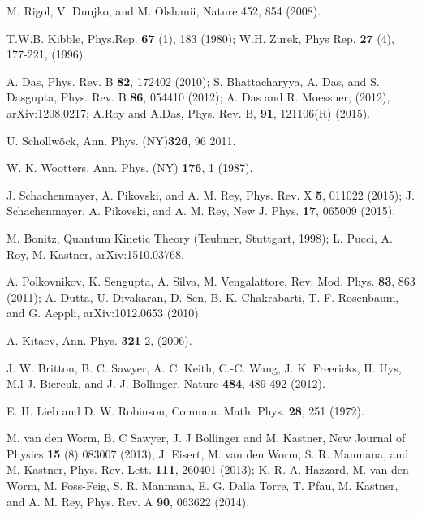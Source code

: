 \documentclass[a4paper,11pt,color]{article}
\renewenvironment{thebibliography}[1]{%
    \begin{oldthebibliography}{#1}%
      \setlength{\parskip}{0ex}%
      \setlength{\itemsep}{0ex}%
  }%
  {%
    \end{oldthebibliography}%
  }
\begin{document}
\pagebreak
\begin{thebibliography}{}
  
M. Rigol, V. Dunjko, and M. Olshanii, Nature 452, 854 (2008).

T.W.B. Kibble, Phys.Rep. {\bf 67} (1), 183 (1980); W.H. Zurek, Phys Rep. {\bf 27} (4), 177-221, (1996).

A. Das, Phys. Rev. B {\bf 82}, 172402 (2010); S. Bhattacharyya, A. Das, and S. Dasgupta, Phys. Rev.
B {\bf 86}, 054410 (2012); A. Das and R. Moessner, (2012), arXiv:1208.0217; A.Roy and A.Das, Phys. Rev. B, {\bf 91}, 121106(R) (2015).

%
 {U.} {Schollw{\"o}ck},  {Ann. Phys. (NY)}\textbf {{326}}, {96}  {2011}.
 
W. K. Wootters, Ann. Phys. (NY) {\bf 176}, 1 (1987).

J. Schachenmayer, A. Pikovski, and A. M. Rey, Phys. Rev. X {\bf 5}, 011022 (2015); J. Schachenmayer, A. Pikovski, and A. M. Rey, New J. Phys.
{\bf 17}, 065009 (2015).

M. Bonitz, Quantum Kinetic Theory (Teubner, Stuttgart, 1998); L. Pucci, A. Roy, M. Kastner, arXiv:1510.03768.


A. Polkovnikov, K. Sengupta, A. Silva, M. Vengalattore, Rev. Mod. Phys. \textbf{83}, 863 (2011); A. Dutta, U. Divakaran, D. Sen, B. K. Chakrabarti, T. F. Rosenbaum, and G. Aeppli, arXiv:1012.0653 (2010).


A. Kitaev, Ann. Phys. {\bf 321} 2, (2006).


J. W. Britton,	B. C. Sawyer,	A. C. Keith,	C.-C. Wang,	J. K. Freericks, H. Uys,	M.l J. Biercuk, and J. J. Bollinger, Nature {\bf 484}, 489-492 (2012).



E. H. Lieb and D. W. Robinson, Commun. Math. Phys. {\bf 28}, 251 (1972).

M. van den Worm, B. C Sawyer, J. J Bollinger and M. Kastner, New Journal of Physics {\bf 15} (8) 083007 (2013); J. Eisert, M. van den Worm, S. R. Manmana, and M. Kastner, Phys. Rev. Lett. {\bf 111}, 260401 (2013); K. R. A. Hazzard, M. van den Worm, M. Foss-Feig, S. R. Manmana, E. G. Dalla Torre, T. Pfau, M. Kastner, and A. M. Rey, Phys. Rev. A {\bf 90}, 063622 (2014).



\end{thebibliography}
\end{document}
